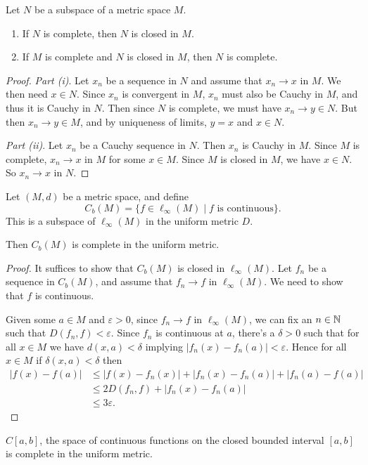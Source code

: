 \documentclass[a4paper]{scrartcl}
\begin{document}
\begin{proposition}
    Let $N$ be a subspace of a metric space $M$. 
    \begin{enumerate}[label=(\roman*)]
        \item If $N$ is complete, then $N$ is closed in $M$.
        \item If $M$ is complete and $N$ is closed in $M$, then $N$ is complete.
    \end{enumerate}
\end{proposition}
\begin{proof}
    \emph{Part (i)}. Let $x_n$ be a sequence in $N$ and assume that $x_n \rightarrow x$ in $M$. We then need $x \in N$. Since $x_n$ is convergent in $M$, $x_n$ must also be Cauchy in $M$, and thus it is Cauchy in $N$. Then since $N$ is complete, we must have $x_n \rightarrow y \in N$. But then $x_n \rightarrow y \in M$, and by uniqueness of limits, $y = x$ and $x \in N$.

    \emph{Part (ii)}. Let $x_n$ be a Cauchy sequence in $N$. Then $x_n$ is Cauchy in $M$. Since $M$ is complete, $x_n \rightarrow x$ in $M$ for some $x \in M$. Since $M$ is closed in $M$, we have $x \in N$. So $x_n \rightarrow x$ in $N$.
\end{proof}

\begin{theorem}
    Let $(M, d)$ be a metric space, and define
    $$
    C_b(M) = \{f \in \ell_{\infty}(M) \mid f \text{ is continuous} \}.
    $$
    This is a subspace of $\ell_{\infty}(M)$ in the uniform metric $D$.

    Then $C_b(M)$ is complete in the uniform metric.
\end{theorem}
\begin{proof}
It suffices to show that $C_b(M)$ is closed in $\ell_{\infty}(M)$. Let $f_n$ be a sequence in $C_b(M)$, and assume that $f_n \rightarrow f$ in $\ell_{\infty}(M)$. We need to show that $f$ is continuous.

Given some $a \in M$ and $\varepsilon > 0$, since $f_n \rightarrow f$ in $\ell_{\infty}(M)$, we can fix an $n \in \mathbb{N}$ such that $D(f_n, f) < \varepsilon$.
Since $f_n$ is continuous at $a$, there's a $\delta > 0$ such that for all $x \in M$ we have $d(x, a) < \delta$ implying $|f_n(x) - f_n(a)| < \varepsilon$. Hence for all $x \in M$ if $\delta(x,a) < \delta$ then
\begin{align*}
    |f(x) - f(a)| &\leq |f(x) - f_n(x)| + |f_n(x) - f_n(a)| + |f_n(a) - f(a)|  \\
    &\leq 2D(f_n, f) + |f_n(x) - f_n(a)|  \\
    & \leq 3\varepsilon.
\end{align*}
\end{proof}

\begin{corollary}
    $C[a, b]$, the space of continuous functions on the closed bounded interval $[a, b]$ is complete in the uniform metric.
\end{corollary}
\end{document}
